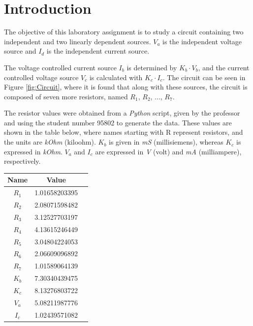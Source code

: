 \section{Introduction}
\label{sec:introduction}

The objective of this laboratory assignment is to study a circuit containing two independent and two linearly dependent sources. $V_a$ is the independent voltage source and $I_d$ is the independent current source.
\par The voltage controlled current source $I_b$ is determined by $K_b \cdot V_b$, and the current controlled voltage source $V_c$ is calculated with $K_c \cdot I_c$.
The circuit can be seen in Figure \ref{fig:Circuit}, where it is found that along with these sources, the circuit is composed of seven more resistors, named $R_1$, $R_2$, ..., $R_7$.
\par The resistor values were obtained from a \textit{Python} script, given by the professor and using the student number 95802 to generate the data. These values are shown in the table below, where names starting with R represent resistors, and the units are \textit{kOhm} (kiloohm). $K_b$ is given in \textit{mS} (millisiemens), whereas $K_c$ is expressed in \textit{kOhm}. $V_a$ and $I_c$ are expressed in \textit{V} (volt) and \textit{mA} (milliampere), respectively.
 
\par

\begin{center}
\begin{tabular}{ |c|c|c| }
 \hline
\textbf{Name} & \textbf{Value} \\
 \hline
 $R_{1}$ & 1.01658203395 \\
 \hline
 $R_{2}$ &  2.08071598482 \\
 \hline
 $R_{3}$ & 3.12527703197  \\
 \hline
 $R_{4}$ & 4.13615246449\\
 \hline
 $R_{5}$ & 3.04804224053  \\
 \hline
 $R_{6}$ & 2.06609096892 \\
 \hline
 $R_{7}$ & 1.01589064139\\
 \hline
 $K_{b}$ & 7.30340439475\\
 \hline
 $K_{c}$ & 8.13276803722\\
 \hline
 $V_{a}$ & 5.08211987776 \\
 \hline
 $I_{c}$ & 1.02439571082 \\
 \hline
\end{tabular}
\end{center}


